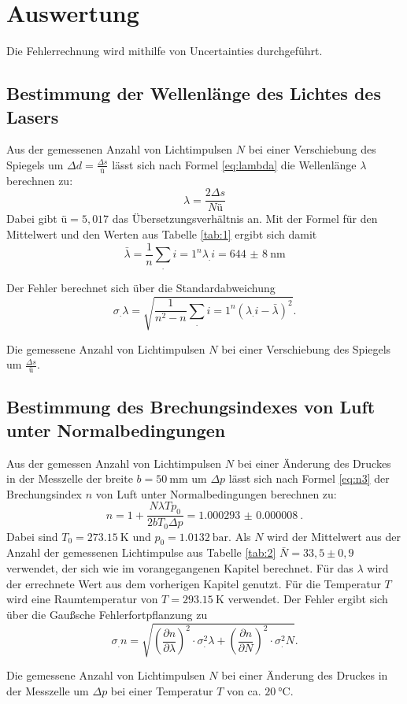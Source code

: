 \section{Auswertung}
\label{sec:Auswertung}

Die Fehlerrechnung wird mithilfe von Uncertainties \cite{uncertainties} durchgeführt.

\subsection{Bestimmung der Wellenlänge des Lichtes des Lasers}

Aus der gemessenen Anzahl von Lichtimpulsen $N$ bei einer Verschiebung des Spiegels um $\Delta d=\frac{\Delta s}{ü}$ lässt sich nach Formel \eqref{eq:lambda} die Wellenlänge $\lambda$ berechnen zu:
\[
	\lambda = \frac{2\Delta s}{N ü}
\]
Dabei gibt $ü=5,017$ das Übersetzungsverhältnis an.
Mit der Formel für den Mittelwert und den Werten aus Tabelle \ref{tab:1} ergibt sich damit
\[
\bar{\lambda}= \frac{1}{n}\sum_.{i=1}^n \lambda_.i = \SI{644(8)}{\nano\meter}
\]

Der Fehler berechnet sich über die Standardabweichung
\[
\sigma_.{\lambda}=\sqrt{\frac{1}{n^2-n}\sum_.{i=1}^n \left(\lambda_.i-\bar{\lambda}\right)^2}\text{.}
\]

\begin{table}
	\centering
	\caption{Die gemessene Anzahl von Lichtimpulsen $N$ bei einer Verschiebung des Spiegels um $\frac{\Delta s}{ü}$.}
	
	\label{tab:1}
\end{table}

\subsection{Bestimmung des Brechungsindexes von Luft unter Normalbedingungen}

Aus der gemessen Anzahl von Lichtimpulsen $N$ bei einer Änderung des Druckes in der Messzelle der breite $b=\SI{50}{\milli\meter}$ um $\Delta p$ lässt sich nach Formel \eqref{eq:n3} der Brechungsindex $n$ von Luft unter Normalbedingungen berechnen zu:
\[
	n = 1+ \frac{N \lambda T p_0}{2 b T_0 \Delta p} = \SI{1.000293(8)}{}\text{.}
\]
Dabei sind $T_0=\SI{273,15}{\kelvin}$ und $p_0=\SI{1,0132}{\bar}$. Als $N$ wird der Mittelwert aus der Anzahl der gemessenen Lichtimpulse aus Tabelle \ref{tab:2}
$\bar{N}=33,5 \pm 0,9$ verwendet, der sich wie im vorangegangenen Kapitel berechnet. Für das $\lambda$ wird der errechnete Wert aus dem vorherigen Kapitel genutzt. Für die Temperatur $T$ wird eine Raumtemperatur von $T=\SI{293,15}{\kelvin}$ verwendet.
Der Fehler ergibt sich über die Gaußsche Fehlerfortpflanzung zu
\[
\sigma_.n=\sqrt{\left(\frac{\partial n}{\partial \lambda}\right)^2\cdot\sigma^2_.{\lambda}+\left(\frac{\partial n}{\partial N}\right)^2\cdot\sigma^2_.N}\text{.}
\]
\begin{table}
	\centering
	\caption{Die gemessene Anzahl von Lichtimpulsen $N$ bei einer Änderung des Druckes in der Messzelle um $\Delta p$ bei einer Temperatur $T$ von ca. $\SI{20}{\degreeCelsius}$.}
	
	\label{tab:2}
\end{table}